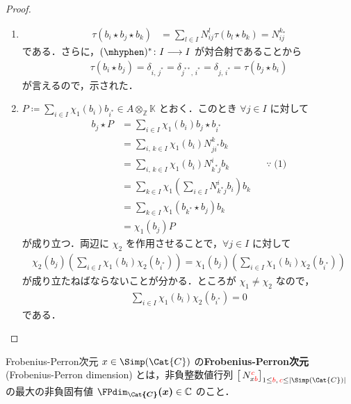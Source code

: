 \documentclass[TQFT_main]{subfiles}
\begin{document}
\begin{proof}
    \begin{enumerate}
        \item 
        \begin{align}
            \tau (b_i \star b_j \star b_k)
            &= \sum_{l \in I} N^l_{ij} \tau (b_l \star b_k) = N^{k_*}_{ij}
        \end{align}
        である．さらに，$(\mhyphen)^* \colon I \lto I$ が対合射であることから
        \begin{align}
            \tau (b_i \star b_j) = \delta_{i,\, j^*} = \delta_{j^{**},\, i^*} = \delta_{j,\, i^*} = \tau (b_j \star b_i)
        \end{align}
        が言えるので，示された．
        \item $P \coloneqq \sum_{i \in I} \chi_1 (b_i) b_{i^*} \in A \otimes_{\mathbb{Z}} \mathbb{K}$ とおく．このとき $\forall j \in I$ に対して
        \begin{align}
            b_j \star P
            &= \sum_{i \in I} \chi_1 (b_i) b_j \star b_{i^*} \\
            &= \sum_{i,\, k \in I} \chi_1 (b_i) N^k_{j i^*} b_k \\
            &= \sum_{i,\, k \in I} \chi_1 (b_i) N^i_{k^* j} b_k &&\because\; \text{(1)} \\
            &= \sum_{k \in I} \chi_1 \left(\sum_{i \in I}  N^i_{k^* j} b_i \right) b_k \\
            &= \sum_{k \in I} \chi_1 (b_{k^*} \star b_j) b_k \\
            &= \chi_1 (b_j) P
        \end{align}
        が成り立つ．両辺に $\chi_2$ を作用させることで，$\forall j \in I$ に対して
        \begin{align}
            \chi_2(b_j) \left(\sum_{i \in I} \chi_1 (b_i) \chi_2(b_{i^*}) \right) 
            = \chi_1 (b_j) \left( \sum_{i \in I} \chi_1 (b_i) \chi_2(b_{i^*}) \right) 
        \end{align}
        が成り立たねばならないことが分かる．ところが $\chi_1 \neq \chi_2$ なので，
        \begin{align}
            \sum_{i \in I} \chi_1 (b_i) \chi_2(b_{i^*}) = 0
        \end{align}
        である．
    \end{enumerate}
    
\end{proof}


\begin{mydef}[label=def:FPdim]{Frobenius-Perron次元}
    $x \in \Simp(\Cat{C})$ の\textbf{Frobenius-Perron次元} (Frobenius-Perron dimension) とは，非負整数値行列 $\bigl[\, N^{\textcolor{red}{c}}_{x \textcolor{red}{b}} \bigr]_{1 \le \textcolor{red}{b},\, \textcolor{red}{c} \le \abs{\Simp(\Cat{C})}}$ の最大の非負固有値 $\bm{\FPdim_{\Cat{C}} (x)} \in \mathbb{C}$ のこと．
\end{mydef}
\end{document}
